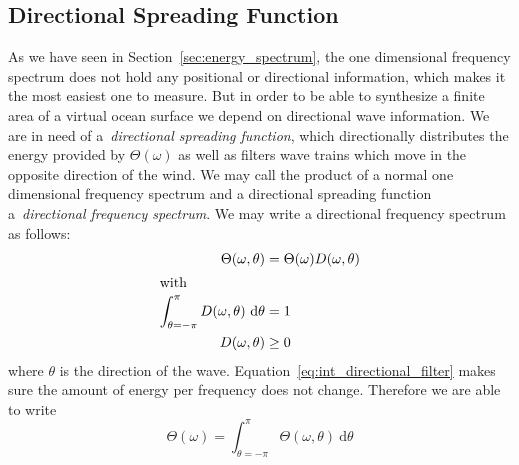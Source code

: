 \subsection{Directional Spreading Function}
As we have seen in
Section~\ref{sec:energy_spectrum}, the one dimensional frequency spectrum does
not hold any positional or directional information, which makes it the most
easiest one to measure. But in order to be able to synthesize a finite area of a
virtual ocean surface we depend on directional wave information. We are in need 
of a~\emph{directional spreading function}, which directionally distributes the
energy provided by $\Theta(\omega)$ as well as filters wave trains which move in
the opposite direction of the wind. We may call the product of a normal one
dimensional frequency spectrum and a directional spreading function
a~\emph{directional frequency spectrum}. We may write a directional frequency
spectrum as follows:
\begin{subequations}
\begin{align}
\label{eq:directional_frequency_spectrum}
 \Theta(\omega, \theta) &= \Theta(\omega)D(\omega,\theta) \\
\intertext{with}
\label{eq:int_directional_filter}
\int_{\theta=-\pi}^{\pi}D(\omega,\theta)~\mathrm{d}\theta &= 1 \\
D(\omega,\theta) &\geq 0
\end{align}
\end{subequations}
where $\theta$ is the direction of the wave.
Equation~\ref{eq:int_directional_filter} makes sure the amount of energy per
frequency does not change. Therefore we are able to write
\begin{equation}
 \Theta(\omega) = \int_{\theta=-\pi}^{\pi}\Theta(\omega,
\theta)~\mathrm{d}\theta
\end{equation}
%

